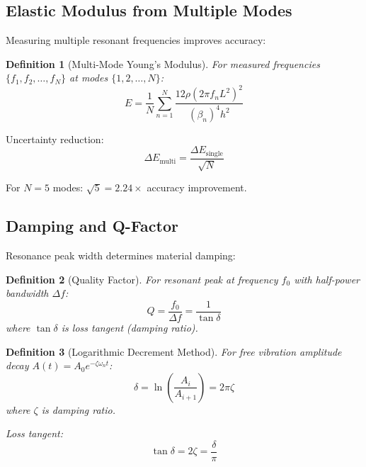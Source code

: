 \documentclass[12pt,a4paper]{article}
\newtheorem{definition}{Definition}
\begin{document}
\subsection{Elastic Modulus from Multiple Modes}

Measuring multiple resonant frequencies improves accuracy:

\begin{definition}[Multi-Mode Young's Modulus]
For measured frequencies $\{f_1, f_2, \ldots, f_N\}$ at modes $\{1, 2, \ldots, N\}$:
\begin{equation}
E = \frac{1}{N}\sum_{n=1}^{N} \frac{12\rho (2\pi f_n L^2)^2}{(\beta_n)^4 h^2}
\end{equation}
\end{definition}

Uncertainty reduction:
\begin{equation}
\Delta E_{\text{multi}} = \frac{\Delta E_{\text{single}}}{\sqrt{N}}
\end{equation}

For $N = 5$ modes: $\sqrt{5} = 2.24\times$ accuracy improvement.

\subsection{Damping and Q-Factor}

Resonance peak width determines material damping:

\begin{definition}[Quality Factor]
For resonant peak at frequency $f_0$ with half-power bandwidth $\Delta f$:
\begin{equation}
Q = \frac{f_0}{\Delta f} = \frac{1}{\tan\delta}
\end{equation}
where $\tan\delta$ is loss tangent (damping ratio).
\end{definition}

\begin{definition}[Logarithmic Decrement Method]
For free vibration amplitude decay $A(t) = A_0 e^{-\zeta \omega_n t}$:
\begin{equation}
\delta = \ln\left(\frac{A_i}{A_{i+1}}\right) = 2\pi\zeta
\end{equation}
where $\zeta$ is damping ratio.

Loss tangent:
\begin{equation}
\tan\delta = 2\zeta = \frac{\delta}{\pi}
\end{equation}
\end{definition}
\end{document}
